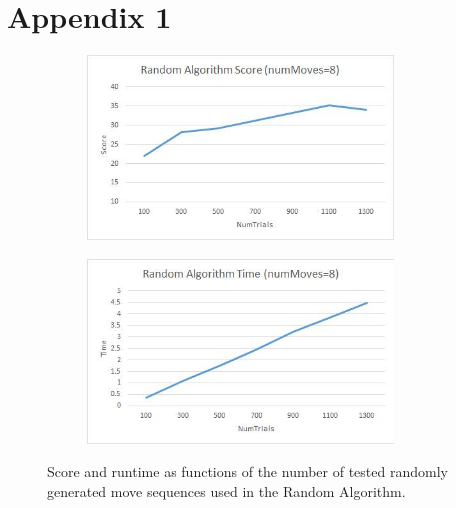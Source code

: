 \documentclass[10pt, final]{article}
\begin{document}
\section{Appendix 1}
\begin{figure}[h]
\begin{center}
\begin{subfigure}[h]{3.2in}
\includegraphics[width=3.2in]{randomScore.jpg}
\end{subfigure}
\begin{subfigure}[h]{3.2in}
\includegraphics[width=3.2in]{randomTime.jpg}
\end{subfigure}
\caption{Score and runtime as functions of the number of tested randomly generated move sequences used in the Random Algorithm.}
\label{fig:randoms}
\end{center}
\end{figure}
\end{document}
